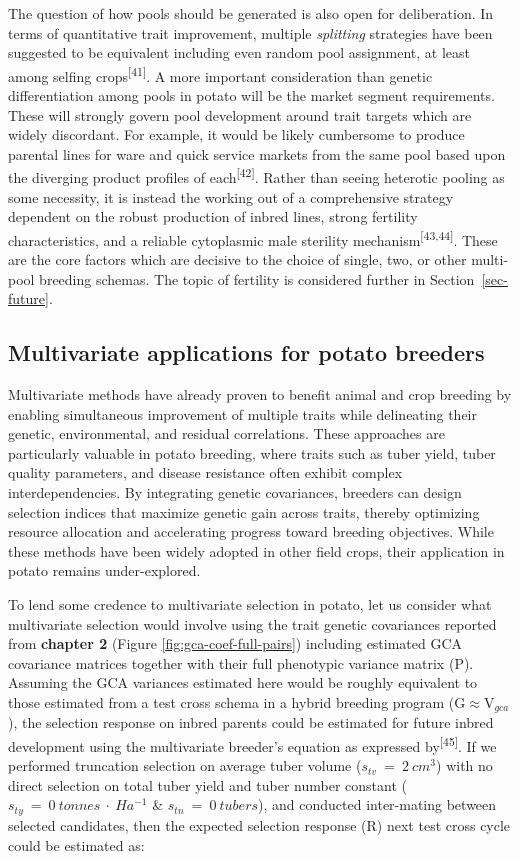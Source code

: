 The question of how pools should be generated is also open for
deliberation. In terms of quantitative trait improvement, multiple
\emph{splitting} strategies have been suggested to be equivalent
including even random pool assignment, at least among selfing
crops\textsuperscript{{[}41{]}}. A more important consideration than
genetic differentiation among pools in potato will be the market segment
requirements. These will strongly govern pool development around trait
targets which are widely discordant. For example, it would be likely
cumbersome to produce parental lines for ware and quick service markets
from the same pool based upon the diverging product profiles of
each\textsuperscript{{[}42{]}}. Rather than seeing heterotic pooling as
some necessity, it is instead the working out of a comprehensive
strategy dependent on the robust production of inbred lines, strong
fertility characteristics, and a reliable cytoplasmic male sterility
mechanism\textsuperscript{{[}43,44{]}}. These are the core factors which
are decisive to the choice of single, two, or other multi-pool breeding
schemas. The topic of fertility is considered further in
Section~\ref{sec-future}.

\subsection{Multivariate applications for potato
breeders}\label{sec-implications}

Multivariate methods have already proven to benefit animal and crop
breeding by enabling simultaneous improvement of multiple traits while
delineating their genetic, environmental, and residual correlations.
These approaches are particularly valuable in potato breeding, where
traits such as tuber yield, tuber quality parameters, and disease
resistance often exhibit complex interdependencies. By integrating
genetic covariances, breeders can design selection indices that maximize
genetic gain across traits, thereby optimizing resource allocation and
accelerating progress toward breeding objectives. While these methods
have been widely adopted in other field crops, their application in
potato remains under-explored.

To lend some credence to multivariate selection in potato, let us
consider what multivariate selection would involve using the trait
genetic covariances reported from \textbf{chapter 2} (Figure
\ref{fig:gca-coef-full-pairs}) including estimated GCA covariance
matrices together with their full phenotypic variance matrix
(\(\mathrm P\)). Assuming the GCA variances estimated here would be
roughly equivalent to those estimated from a test cross schema in a
hybrid breeding program (\(\mathrm {G} \approx \mathrm {V}_{gca}\)), the
selection response on inbred parents could be estimated for future
inbred development using the multivariate breeder's equation as
expressed by\textsuperscript{{[}45{]}}. If we performed truncation
selection on average tuber volume (\(s_{tv}~=~2~cm^3\)) with no direct
selection on total tuber yield and tuber number constant
(\(s_{ty}~=~0~tonnes~\cdot~Ha^{-1}\)  \&  \(s_{tn}~=~0~tubers\)), and
conducted inter-mating between selected candidates, then the expected
selection response (\(\mathrm R\)) next test cross cycle could be
estimated as:

